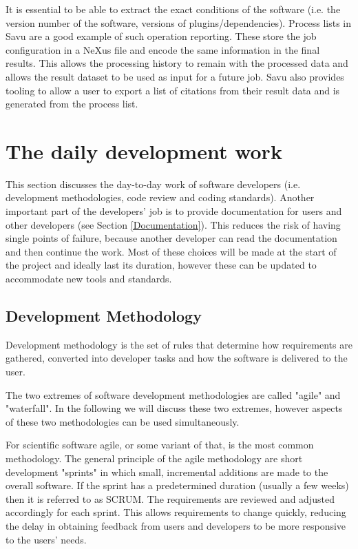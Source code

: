 \documentclass[jnr]{iosart2x}
\begin{document}
It is essential to be able to extract the exact conditions of the software (i.e. the version number of the software, versions of plugins/dependencies).
Process lists in Savu \cite{Wadeson_2016} are a good example of such operation reporting.
These store the job configuration in a NeXus file and encode the same information in the final results.
This allows the processing history to remain with the processed data and allows the result dataset to be used as input for a future job.
Savu also provides tooling to allow a user to export a list of citations from their result data and is generated from the process list.

\section{The daily development work}
\label{Business as Usual}

This section discusses the day-to-day work of software developers (i.e. development methodologies, code review and coding standards).
Another important part of the developers' job is to provide documentation for users and other developers (see Section \ref{Documentation}).
This reduces the risk of having single points of failure, because another developer can read the documentation and then continue the work.
Most of these choices will be made at the start of the project and ideally last its duration, however these can be updated to accommodate new tools and standards.

\subsection{Development Methodology}
\label{Development methodology}

Development methodology is the set of rules that determine how requirements are gathered, converted into developer tasks and how the software is delivered to the user.

The two extremes of software development methodologies are called "agile" and "waterfall".
In the following we will discuss these two  extremes, however aspects of these two methodologies can be used simultaneously.

For scientific software agile, or some variant of that, is the most common methodology.
The general principle of the agile methodology are short development "sprints" in which small, incremental additions are made to the overall software.
If the sprint has a predetermined duration (usually a few weeks) then it is referred to as SCRUM.
The requirements are reviewed and adjusted accordingly for each sprint.
This allows requirements to change quickly, reducing the delay in obtaining feedback from users and developers to be more responsive to the users' needs.
\end{document}
